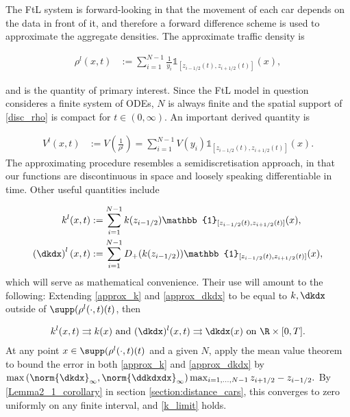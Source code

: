 The FtL system is forward-looking in that the movement of each car depends on the data in front of it, and therefore a forward difference scheme is used to approximate the aggregate densities. The approximate traffic density is

\begin{align} \label{disc_rho}
    \rho^l(x,t) &:= \sum_{i = 1}^{N-1} \frac{1}{y_i}\mathbb{1}_{[z_{i - 1/2}(t), z_{i + 1/2}(t)]}(x),
\end{align}

and is the quantity of primary interest. Since the FtL model in question consideres a finite system of ODEs, $N$ is always finite and the spatial support of \eqref{disc_rho} is compact for $t \in (0,\infty)$. An important derived quantity is 

\begin{align} \label{disc_V}
    V^l(x,t) &:= V\left(\frac{1}{\rho^l}\right) = \sum_{i = 1}^{N-1} V(y_i)\mathbb{1}_{[z_{i - 1/2}(t), z_{i + 1/2}(t)]}(x). 
\end{align}
The approximating procedure resembles a semidiscretisation approach, in that our functions are discontinuous in space and loosely speaking differentiable in time. Other useful quantities include 

\begin{align} 
    k^l(x,t) &:= \sum_{i = 1}^{N-1} k(z_{i-1/2}) \mathbb{1}_{[z_{i - 1/2}(t), z_{i + 1/2}(t)]}(x), \label{approx_k}\\
    \left(\dkdx \right)^l(x,t) &:= \sum_{i = 1}^{N-1} D_+(k(z_{i-1/2})) \mathbb{1}_{[z_{i - 1/2}(t), z_{i + 1/2}(t)]}(x) \label{approx_dkdx}, \\
\end{align}
which will serve as mathematical convenience. Their use will amount to the following: Extending \eqref{approx_k} and \eqref{approx_dkdx} to be equal to $k, \dkdx$ outside of $\supp(\rho^l(\cdot,t)(t)$, then 

\begin{align} \label{k_limit}
     k^l(x,t) \rightrightarrows k(x) \text{ and }
     (\dkdx)^l(x,t) \rightrightarrows \dkdx(x) \text{ on } \R \times [0,T]. 
\end{align}
At any point $x \in \supp(\rho^l(\cdot,t)(t)$ and a given $N$, apply the mean value theorem to bound the error in both \eqref{approx_k} and \eqref{approx_dkdx} by $\max\left(\norm{\dkdx}_\infty, \norm{\ddkdxdx}_\infty\right) \max_{i = 1,...,N-1} z_{i+1/2} - z_{i-1/2}.$ By \eqref{Lemma2_1_corollary} in section \ref{section:distance_cars}, this converges to zero uniformly on any finite interval, and \eqref{k_limit} holds. 

